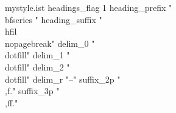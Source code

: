 \usepackage[original]{imakeidx}
\makeindex[title=Stichwortverzeichnis, options=-s mystyle]
\usepackage{filecontents}
\begin{filecontents}{mystyle.ist}
	headings_flag  1 %
	heading_prefix "{\\bfseries " %
	heading_suffix "\\hfil}\\nopagebreak\n"%
	delim_0 "\\dotfill" %
	delim_1 "\\dotfill" %
	delim_2 "\\dotfill" %
	delim_r "--" %
	suffix_2p "\\,f." %
	suffix_3p "\\,ff." %
\end{filecontents}

\usepackage[style=alphabetic, isbn=false, backend=bibtex]{biblatex}

%

\usepackage[pdfauthor={\VarAuthor}, pdftitle={\VarTitel}, pdfsubject={\VarFachgebiet}, pdfkeywords={\VarKeywords}, hidelinks, breaklinks=true, pdffitwindow=true, pdfpagelayout=SinglePage]{hyperref}